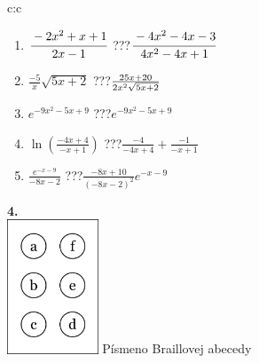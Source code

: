 \documentclass[10pt]{report}
\begin{document}
\begin{tabular}{c:c}
\begin{minipage}[c][104.5mm][t]{0.5\linewidth}
\begin{center}
\begin{minipage}{0.79\linewidth}
\begin{center}
\begin{varwidth}{\linewidth}
\begin{enumerate}
\item $\cfrac{-2x^2+x+1}{2x-1}$\quad \dotfill\; ???\;\dotfill \quad $\cfrac{-4x^2-4x-3}{4x^2-4x+1}$
\item $\frac{-5}{x}\sqrt{5x+2}$\quad \dotfill\; ???\;\dotfill \quad $\frac{25x+20}{2x^2 \sqrt{\smash[b]{5x+2}}}$
\item $e^{-9x^2-5x+9}$\quad \dotfill\; ???\;\dotfill \quad $e^{-9x^2-5x+9}$
\item $\ln{\left(\frac{-4x+4}{-x+1}\right)}$\quad \dotfill\; ???\;\dotfill \quad $\frac{-4}{-4x+4}+\frac{-1}{-x+1}$
\item $\frac{e^{-x-9}}{-8x-2}$\quad \dotfill\; ???\;\dotfill \quad $\frac{-8x+10}{(-8x-2)^2}e^{-x-9}$
\end{enumerate}
\end{varwidth}
\end{center}
\end{minipage}
\begin{minipage}{0.20\linewidth}
\begin{center}
{\Huge\bfseries 4.} \\[2mm]
\includegraphics[height=40mm]{../images/braille.png}
{\small Písmeno Braillovej abecedy}
\end{center}
\end{minipage}
\end{center}
\end{minipage}
%
\end{tabular}
\newpage
\thispagestyle{empty}
\end{document}
